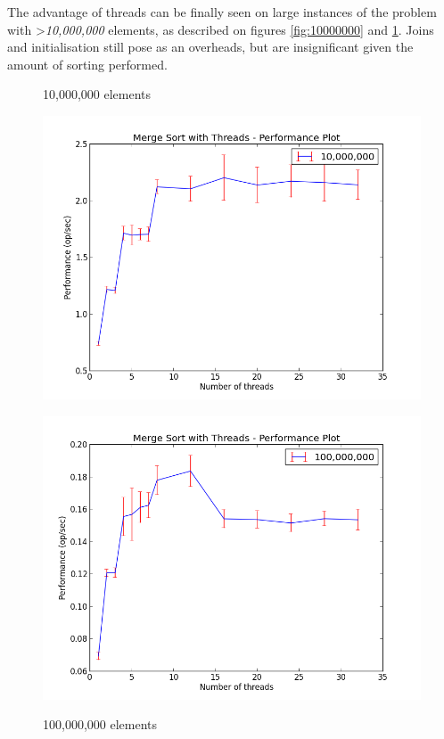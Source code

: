 \documentclass{article}
\begin{document}
  The advantage of threads can be finally seen on large instances of the problem with \textgreater\textit{10,000,000} elements, as described on figures \ref{fig:10000000} and \ref{fig:100000000}. Joins and initialisation still pose as an overheads, but are insignificant given the amount of sorting performed.

  \clearpage

  \begin{figure}
  \centering
  \begin{minipage}{0.45\textwidth}
    \caption{10,000,000 elements}
    \includegraphics[width=1\linewidth, natwidth=800, natheight=600]{evaluation/graphs/10000000.png}
    \label{fig:10000000}
  \end{minipage}
  \begin{minipage}{0.45\textwidth}
    \caption{100,000,000 elements}
    \includegraphics[width=1\linewidth, natwidth=800, natheight=600]{evaluation/graphs/100000000.png}
    \label{fig:100000000}
  \end{minipage}
  \end{figure}
\end{document}
